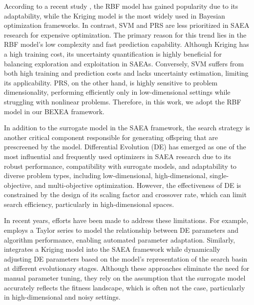 \documentclass[review]{elsarticle}
\begin{document}
According to a recent study \cite{he2023review}, the RBF model has gained popularity due to its adaptability, while the Kriging model is the most widely used in Bayesian optimization frameworks. In contrast, SVM and PRS are less prioritized in SAEA research for expensive optimization. The primary reason for this trend lies in the RBF model's low complexity and fast prediction capability. Although Kriging has a high training cost, its uncertainty quantification is highly beneficial for balancing exploration and exploitation in SAEAs. Conversely, SVM suffers from both high training and prediction costs and lacks uncertainty estimation, limiting its applicability. PRS, on the other hand, is highly sensitive to problem dimensionality, performing efficiently only in low-dimensional settings while struggling with nonlinear problems. Therefore, in this work, we adopt the RBF model in our BEXEA framework.

In addition to the surrogate model in the SAEA framework, the search strategy is another critical component responsible for generating offspring that are prescreened by the model. Differential Evolution (DE) has emerged as one of the most influential and frequently used optimizers in SAEA research \cite{khaldi2024surrogate} due to its robust performance, compatibility with surrogate models, and adaptability to diverse problem types, including low-dimensional, high-dimensional, single-objective, and multi-objective optimization. However, the effectiveness of DE is constrained by the design of its scaling factor and crossover rate, which can limit search efficiency, particularly in high-dimensional spaces. 

In recent years, efforts have been made to address these limitations. For example, \cite{stanovov2023surrogate} employs a Taylor series to model the relationship between DE parameters and algorithm performance, enabling automated parameter adaptation. Similarly, \cite{mallipeddi2015evolving} integrates a Kriging model into the SAEA framework while dynamically adjusting DE parameters based on the model's representation of the search basin at different evolutionary stages. Although these approaches eliminate the need for manual parameter tuning, they rely on the assumption that the surrogate model accurately reflects the fitness landscape, which is often not the case, particularly in high-dimensional and noisy settings.
\end{document}
